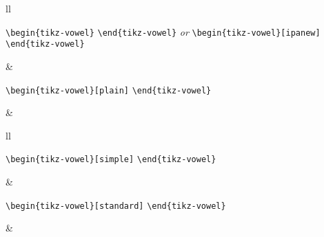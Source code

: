 \documentclass{article}
\def\\{}%
\begin{document}
\begin{center}
\begin{tabular}{ll}
  \begin{minipage}[t]{6.5cm}{\small
    \verb|\begin{tikz-vowel}|\\
    \verb|\end{tikz-vowel}|\\
    \emph{or}\\
    \verb|\begin{tikz-vowel}[ipanew]|\\
    \verb|\end{tikz-vowel}|\\}
  \end{minipage} &
  \begin{minipage}[t]{6.5cm}{\small
    \verb|\begin{tikz-vowel}[plain]|\\
    \verb|\end{tikz-vowel}|\\}
  \end{minipage} \\
  \begin{minipage}[t]{6.5cm}{
  \begin{tikz-vowel}[ipanew]\end{tikz-vowel} \\}\end{minipage} &
  \begin{minipage}[t]{6.5cm}{
  \begin{tikz-vowel}[plain]\end{tikz-vowel} \\}\end{minipage}
\end{tabular}

\begin{tabular}{ll}
  \begin{minipage}[t]{6.5cm}{\small
    \verb|\begin{tikz-vowel}[simple]|\\
    \verb|\end{tikz-vowel}|\\}
  \end{minipage} &
  \begin{minipage}[t]{6.5cm}{\small
    \verb|\begin{tikz-vowel}[standard]|\\
    \verb|\end{tikz-vowel}|\\}
  \end{minipage} \\
  \begin{minipage}[t]{6.5cm}{
  \begin{tikz-vowel}[simple]\end{tikz-vowel} \\}\end{minipage} &
  \begin{minipage}[t]{6.5cm}{
  \begin{tikz-vowel}[standard]\end{tikz-vowel} \\}\end{minipage}
\end{tabular}


\end{center}
\end{document}
